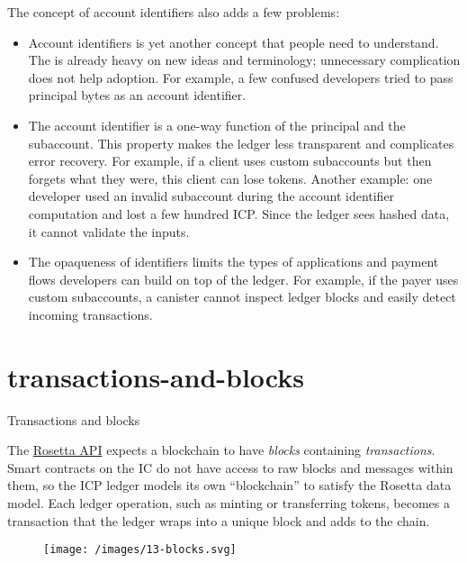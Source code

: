 \documentclass{article}
\begin{document}
The concept of account identifiers also adds a few problems:
\begin{itemize}
  \item
    Account identifiers is yet another concept that people need to understand.
    The  is already heavy on new ideas and terminology; unnecessary complication does not help adoption.
    For example, a few confused developers tried to pass principal bytes as an account identifier.
  \item
    The account identifier is a one-way function of the principal and the subaccount.
    This property makes the ledger less transparent and complicates error recovery.
    For example, if a client uses custom subaccounts but then forgets what they were, this client can lose tokens.
    Another example: one developer used an invalid subaccount during the account identifier computation and lost a few hundred ICP.
    Since the ledger sees hashed data, it cannot validate the inputs.
  \item
    The opaqueness of identifiers limits the types of applications and payment flows developers can build on top of the ledger.
    For example, if the payer uses custom subaccounts, a canister cannot inspect ledger blocks and easily detect incoming transactions.
\end{itemize}

\section{transactions-and-blocks}{Transactions and blocks}

The \href{https://rosetta-api.org}{Rosetta API} expects a blockchain to have \emph{blocks} containing \emph{transactions}.
Smart contracts on the IC do not have access to raw blocks and messages within them, so the ICP ledger models its own ``blockchain'' to satisfy the Rosetta data model. 
Each ledger operation, such as minting or transferring tokens, becomes a transaction that the ledger wraps into a unique block and adds to the chain.

\begin{figure}[grayscale-diagram]
\texttt{[image: /images/13-blocks.svg]}
\end{figure}
\end{document}
